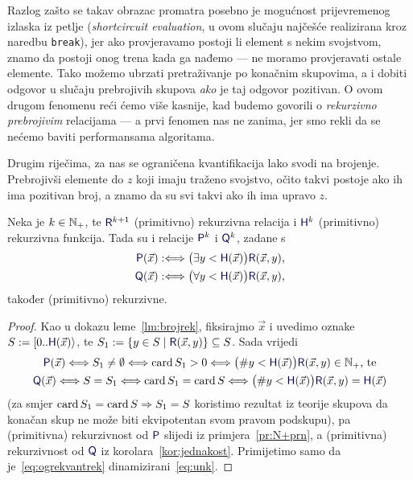 Razlog zašto se takav obrazac promatra posebno je mogućnost prijevremenog izlaska iz petlje (\emph{shortcircuit evaluation}, u ovom slučaju najčešće realizirana kroz naredbu \texttt{break}), jer ako provjeravamo postoji li element s nekim svojstvom, znamo da postoji onog trena kada ga nađemo --- ne moramo provjeravati ostale elemente. Tako možemo ubrzati pretraživanje po konačnim skupovima, a i dobiti odgovor u slučaju prebrojivih skupova \emph{ako} je taj odgovor pozitivan. O ovom drugom fenomenu reći ćemo više kasnije, kad budemo govorili o \emph{rekurzivno prebrojivim} relacijama --- a prvi fenomen nas ne zanima, jer smo rekli da se nećemo baviti performansama algoritama.

Drugim riječima, za nas se ograničena kvantifikacija lako svodi na brojenje. Prebrojivši elemente do $z$ koji imaju traženo svojstvo, očito takvi postoje ako ih ima pozitivan broj, a znamo da su svi takvi ako ih ima upravo $z$.

\begin{propozicija}[{name=[ograničena kvantifikacija čuva primitivnu rekurzivnost]}]\label{prop:okvantrek}
Neka je $k\in{\mathbb N}_+$, te $\f R^{k+1}$ (primitivno) rekurzivna relacija i $\f H^k$ (primitivno) rekurzivna funkcija. Tada su i relacije $\f P^k$ i $\f Q^k$, zadane s
\begin{align}
    \f P(\vec x):\Longleftrightarrow\bigl(\exists y<\f H(\vec x)\bigr)\f R(\vec x,y)\text,\\
    \f Q(\vec x):\Longleftrightarrow\bigl(\forall y<\f H(\vec x)\bigr)\f R(\vec x,y)\text,
\end{align}
također (primitivno) rekurzivne.
\end{propozicija}
\begin{proof}
    Kao u dokazu leme~\ref{lm:brojrek}, fiksirajmo $\vec x$ i uvedimo oznake $S:=[0..\f H(\vec x)\rangle$, te $S_1:=\{y\in S\mid\f R(\vec x,y)\}\subseteq S$. Sada vrijedi
    \begin{gather}
    \label{eq:ogrekvantrek}
        \f P(\vec x)\Longleftrightarrow S_1\not=\emptyset\Longleftrightarrow\card S_1>0\Longleftrightarrow\bigl(\#y<\f H(\vec x)\bigr)\f R(\vec x,y)\in\N_+\text{, te}\\
        \f Q(\vec x)\Longleftrightarrow S=S_1\Longleftrightarrow\card S_1=\card S\Longleftrightarrow\bigl(\#y<\f H(\vec x)\bigr)\f R(\vec x,y)\eq\f H(\vec x)
    \end{gather}
    (za smjer $\operatorname{card} S_1=\operatorname{card} S\Rightarrow S_1=S$ koristimo rezultat iz teorije skupova da konačan skup ne može biti ekvipotentan svom pravom podskupu), pa (primitivna) rekurzivnost od $\f P$ slijedi iz primjera~\ref{pr:N+prn}, a (primitivna) rekurzivnost od $\f Q$ iz korolara~\ref{kor:jednakost}. Primijetimo samo da je~\eqref{eq:ogrekvantrek} dinamizirani~\eqref{eq:unk}.
\end{proof}

